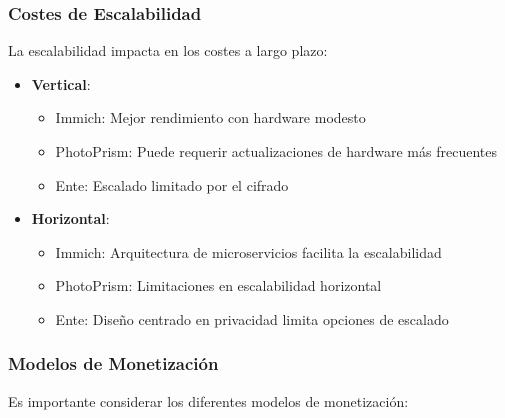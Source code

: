 \subsubsection{Costes de Escalabilidad}

La escalabilidad impacta en los costes a largo plazo:

\begin{itemize}
    \item \textbf{Vertical}:
    \begin{itemize}
        \item Immich: Mejor rendimiento con hardware modesto
        \item PhotoPrism: Puede requerir actualizaciones de hardware más frecuentes
        \item Ente: Escalado limitado por el cifrado
    \end{itemize}

    \item \textbf{Horizontal}:
    \begin{itemize}
        \item Immich: Arquitectura de microservicios facilita la escalabilidad
        \item PhotoPrism: Limitaciones en escalabilidad horizontal
        \item Ente: Diseño centrado en privacidad limita opciones de escalado
    \end{itemize}
\end{itemize}

\subsubsection{Modelos de Monetización}

Es importante considerar los diferentes modelos de monetización:

